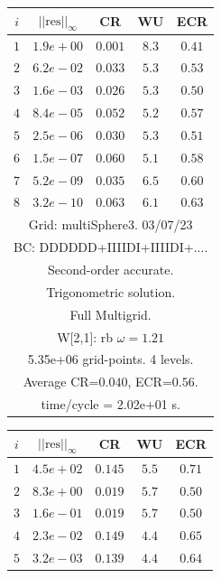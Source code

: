 \begin{table}[hbt]
\begin{center}
{\tablefontsize
\begin{tabular}{|c|c|c|c|c|} \hline 
 $i$   & $\vert\vert\mbox{res}\vert\vert_\infty$  &  CR     &  WU    & ECR  \\   \hline 
 $ 1$  & $ 1.9e+00$ & $0.001$ & $ 8.3$ & $0.41$ \\ 
 $ 2$  & $ 6.2e-02$ & $0.033$ & $ 5.3$ & $0.53$ \\ 
 $ 3$  & $ 1.6e-03$ & $0.026$ & $ 5.3$ & $0.50$ \\ 
 $ 4$  & $ 8.4e-05$ & $0.052$ & $ 5.2$ & $0.57$ \\ 
 $ 5$  & $ 2.5e-06$ & $0.030$ & $ 5.3$ & $0.51$ \\ 
 $ 6$  & $ 1.5e-07$ & $0.060$ & $ 5.1$ & $0.58$ \\ 
 $ 7$  & $ 5.2e-09$ & $0.035$ & $ 6.5$ & $0.60$ \\ 
 $ 8$  & $ 3.2e-10$ & $0.063$ & $ 6.1$ & $0.63$ \\ 
\hline 
\multicolumn{5}{|c|}{Grid: multiSphere3. 03/07/23}  \\
\multicolumn{5}{|c|}{BC: DDDDDD+IIIIDI+IIIIDI+....}  \\
\multicolumn{5}{|c|}{Second-order accurate.}  \\
\multicolumn{5}{|c|}{Trigonometric solution.}  \\
\multicolumn{5}{|c|}{Full Multigrid.}  \\
\multicolumn{5}{|c|}{W[2,1]: rb $\omega=1.21$}  \\
\multicolumn{5}{|c|}{5.35e+06 grid-points. 4 levels.}  \\
\multicolumn{5}{|c|}{Average CR=$0.040$, ECR=$0.56$.}  \\
\multicolumn{5}{|c|}{time/cycle = 2.02e+01 s.}  \\
\hline 
\end{tabular}
\begin{tabular}{|c|c|c|c|c|} \hline 
 $i$   & $\vert\vert\mbox{res}\vert\vert_\infty$  &  CR     &  WU    & ECR  \\   \hline 
 $ 1$  & $ 4.5e+02$ & $0.145$ & $ 5.5$ & $0.71$ \\ 
 $ 2$  & $ 8.3e+00$ & $0.019$ & $ 5.7$ & $0.50$ \\ 
 $ 3$  & $ 1.6e-01$ & $0.019$ & $ 5.7$ & $0.50$ \\ 
 $ 4$  & $ 2.3e-02$ & $0.149$ & $ 4.4$ & $0.65$ \\ 
 $ 5$  & $ 3.2e-03$ & $0.139$ & $ 4.4$ & $0.64$ \\ 

\end{tabular}}
\end{center}
\end{table}
